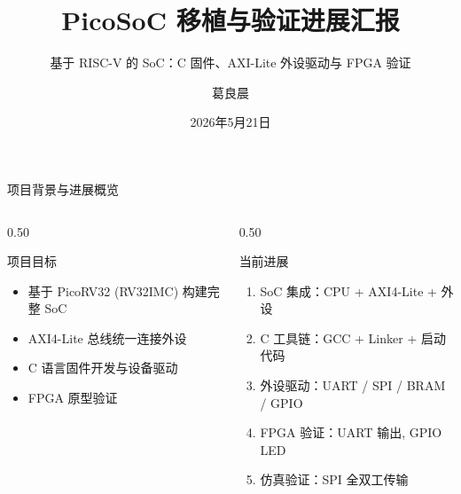 \documentclass[aspectratio=169, 10pt, UTF8]{ctexbeamer}
\title[PicoSoC 移植进展]{PicoSoC 移植与验证进展汇报}
\subtitle{基于 RISC-V 的 SoC：C 固件、AXI-Lite 外设驱动与 FPGA 验证}
\author[葛良晨]{葛良晨}
\institute[组会汇报]{组会汇报}
\date{2026年5月21日}
\begin{document}
\begin{frame}
  \titlepage
\end{frame}

\begin{frame}{项目背景与进展概览}
  \begin{columns}[T]
    \begin{column}{0.50\textwidth}
      \begin{block}{项目目标}
        \begin{itemize}
          \item 基于 PicoRV32 (RV32IMC) 构建完整 SoC
          \item AXI4-Lite 总线统一连接外设
          \item C 语言固件开发与设备驱动
          \item FPGA 原型验证
        \end{itemize}
      \end{block}
    \end{column}
    \begin{column}{0.50\textwidth}
      \begin{exampleblock}{当前进展 \checkmark}
        \begin{enumerate}
          \item SoC 集成：CPU + AXI4-Lite + 外设
          \item C 工具链：GCC + Linker + 启动代码
          \item 外设驱动：UART / SPI / BRAM / GPIO
          \item FPGA 验证：UART 输出, GPIO LED
          \item 仿真验证：SPI 全双工传输
        \end{enumerate}
      \end{exampleblock}
    \end{column}
  \end{columns}
\end{frame}
\end{document}
